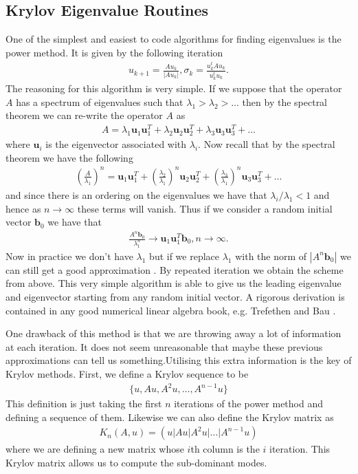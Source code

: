 \subsection{Krylov Eigenvalue Routines}
One of the simplest and easiest to code algorithms for finding eigenvalues is the power method. It is given by the following iteration \cite{MeyerLinAlg}
\begin{align}
u_{k+1}=\frac{Au_{k}}{|Au_{k}|}, \sigma_{k}=\frac{u_{k}^{t}Au_{k}}{u_{k}^{t}u_{k}}.
\end{align}
The reasoning for this algorithm is very simple. If we suppose that the operator $A$ has a spectrum of eigenvalues such that $\lambda_{1} > \lambda_{2} > \ldots $ then by the spectral theorem we can re-write the operator $A$ as
\begin{align}
A = \lambda_{1}\bm{u}_{1}\bm{u}_{1}^{T} + \lambda_{2}\bm{u}_{2}\bm{u}_{2}^{T} + \lambda_{3}\bm{u}_{3}\bm{u}_{3}^{T} + \ldots 
\end{align} 
where $\bm{u}_{i}$ is the eigenvector associated with $\lambda_{i}$. Now recall that by the spectral theorem we have the following \cite{MeyerLinAlg}
\begin{align}
\left(\frac{A}{\lambda_{1}}\right)^{n} = \bm{u}_{1}\bm{u}_{1}^{T} + \left(\frac{\lambda_{2}}{\lambda_{1}}\right)^{n}\bm{u}_{2}\bm{u}_{2}^{T} + \left(\frac{\lambda_{3}}{\lambda_{1}}\right)^{n}\bm{u}_{3}\bm{u}_{3}^{T} + \ldots 
\end{align}
and since there is an ordering on the eigenvalues we have that $\lambda_{i}/\lambda_{1}<1$ and hence as $n\rightarrow\infty$ these terms will vanish. Thus if we consider a random initial vector $\bm{b}_{0}$ we have that 
\begin{align}
\frac{A^{n}\bm{b}_{0}}{\lambda_{1}^{n}}\rightarrow \bm{u}_{1}\bm{u}_{1}^{T}\bm{b}_{0}, n\rightarrow\infty.
\end{align}
Now in practice we don't have $\lambda_{1}$ but if we replace $\lambda_{1}$ with the norm of $|A^{n}\bm{b}_{0}|$ we can still get a good approximation \cite{MeyerLinAlg}. By repeated iteration we obtain the scheme from above. This very simple algorithm is able to give us the leading eigenvalue and eigenvector starting from any random initial vector. A rigorous derivation is contained in any good numerical linear algebra book, e.g. Trefethen and Bau \cite{trefethen1997}.

One drawback of this method is that we are throwing away a lot of information at each iteration. It does not seem unreasonable that maybe these previous approximations can tell us something.Utilising this extra information is the key of Krylov methods. First, we define a Krylov sequence to be 
\begin{align}
\{u,Au,A^{2}u,\ldots,A^{n-1}u\}
\end{align}
This definition is just taking the first $n$ iterations of the power method and defining a sequence of them. Likewise we can also define the Krylov matrix as 
\begin{align}
K_{n}(A,u)=(u|Au|A^{2}u|\ldots|A^{n-1}u)
\end{align}
where we are defining a new matrix whose $i$th column is the $i$ iteration. This Krylov matrix allows us to compute the sub-dominant modes.  

